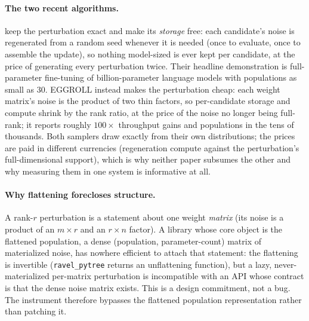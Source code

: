 \paragraph{The two recent algorithms.}
\citet{qiu2025} keep the perturbation exact and make its \emph{storage} free:
each candidate's noise is regenerated from a random seed whenever it is
needed (once to evaluate, once to assemble the update), so nothing
model-sized is ever kept per candidate, at the price of generating every
perturbation twice. Their headline demonstration is full-parameter
fine-tuning of billion-parameter language models with populations as small
as 30. EGGROLL \citep{eggroll2025} instead makes the perturbation cheap: each
weight matrix's noise is the product of two thin factors, so per-candidate
storage and compute shrink by the rank ratio, at the price of the noise no
longer being full-rank; it reports roughly $100\times$ throughput gains and
populations in the tens of thousands. Both samplers draw exactly from
their own distributions; the prices are paid in different currencies
(regeneration compute against the perturbation's full-dimensional
support), which is why neither paper subsumes
the other and why measuring them in one system is informative at all.

\paragraph{Why flattening forecloses structure.} A rank-$r$
perturbation is a statement about one weight \emph{matrix} (its noise is a
product of an $m\times r$ and an $r\times n$ factor). A library whose core
object is the flattened population, a dense (population, parameter-count)
matrix of materialized noise, has nowhere efficient to attach that
statement: the flattening is invertible (\texttt{ravel\_pytree} returns an
unflattening function), but a lazy, never-materialized per-matrix
perturbation is incompatible with an API whose contract is that the dense
noise matrix exists. This is a design commitment, not a bug. The instrument
therefore bypasses the flattened population representation rather than
patching it.

